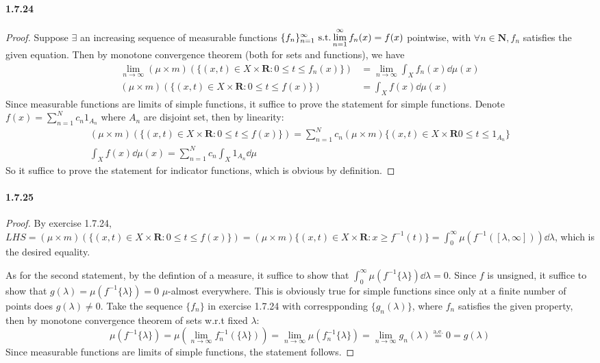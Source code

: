 \documentclass{article}
\begin{document}
\paragraph{1.7.24}
\begin{proof}
Suppose $\exists$ an increasing sequence of measurable functions $\{f_n\}_{n=1}^\infty\text{ s.t.}\lim\limits_{n=1}^\infty f_n(x)=f(x)$ pointwise, with $\forall n\in\mathbf{N},f_n$ satisfies the given equation. Then by monotone convergence theorem (both for sets and functions), we have
\[\begin{aligned}
\lim_{n\to\infty}(\mu\times m)(\{(x,t)\in X\times\mathbf{R}:0\leq t\leq f_n(x)\})&=\lim_{n\to\infty}\int_X f_n(x)\dd\mu(x)\\
(\mu\times m)(\{(x,t)\in X\times\mathbf{R}:0\leq t\leq f(x)\})&=\int_X f(x)\dd \mu(x)
\end{aligned}\]
Since measurable functions are limits of simple functions, it suffice to prove the statement for simple functions. Denote $f(x)=\sum\limits_{n=1}^N c_n 1_{A_n}$ where $A_n$ are disjoint set, then by linearity:
\begin{gather*}
(\mu\times m)(\{(x,t)\in X\times\mathbf{R}:0\leq t\leq f(x)\})=\sum_{n=1}^{N}c_n(\mu\times m)\{(x,t)\in X\times \mathbf{R}0\leq t\leq 1_{A_n}\}\\
\int_X f(x)\dd\mu(x)=\sum_{n=1}^N c_n\int_X 1_{A_n}\dd\mu
\end{gather*}
So it suffice to prove the statement for indicator functions, which is obvious by definition.
\end{proof}
\paragraph{1.7.25}
\begin{proof}
By exercise 1.7.24, $LHS=(\mu\times m)(\{(x,t)\in X\times \mathbf{R}:0\leq t\leq f(x)\})=(\mu\times m)\{(x,t)\in X\times\mathbf{R}:x\geq f^{-1}(t)\}=\int_0^\infty\mu(f^{-1}([\lambda,\infty]))\dd\lambda$, which is the desired equality.

As for the second statement, by the defintion of a measure, it suffice to show that $\int_0^\infty\mu(f^{-1}\{\lambda\})\dd\lambda=0$. Since $f$ is unsigned, it suffice to show that $g(\lambda)=\mu(f^{-1}\{\lambda\})=0$ $\mu$-almost everywhere. This is obviously true for simple functions since only at a finite number of points does $g(\lambda)\neq 0$. Take the sequence $\{f_n\}$ in exercise 1.7.24 with correspponding $\{g_n(\lambda)\}$, where $f_n$ satisfies the given property, then by monotone convergence theorem of sets w.r.t fixed $\lambda$:
\[\mu(f^{-1}\{\lambda\})=\mu(\lim_{n\to\infty}f^{-1}_n(\{\lambda\}))=\lim_{n\to\infty}\mu(f^{-1}_n\{\lambda\})=\lim_{n\to\infty}g_n(\lambda)\stackrel{\mathrm{a.e.}}{=}0=g(\lambda)\]
Since measurable functions are limits of simple functions, the statement follows.
\end{proof}
\end{document}
